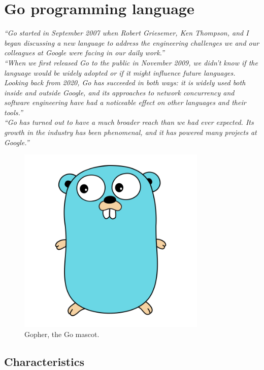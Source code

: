 \documentclass[
  digital,
  color,
  oneside,
  nosansbold,
  nocolorbold,
  nolof,
  nolot,
]{fithesis4}
\begin{document}
\chapter{Go programming language}\label{chapter-go}

\noindent
\textit{\enquote{Go started in September 2007 when Robert Griesemer, Ken Thompson, and I began discussing a new language to address the engineering challenges we and our colleagues at Google were facing in our daily work.}} \\

\noindent
\textit{\enquote{When we first released Go to the public in November 2009, we didn’t know if the language would be widely adopted or if it might influence future languages. Looking back from 2020, Go has succeeded in both ways: it is widely used both inside and outside Google, and its approaches to network concurrency and software engineering have had a noticeable effect on other languages and their tools.}} \\

\noindent
\textit{\enquote{Go has turned out to have a much broader reach than we had ever expected. Its growth in the industry has been phenomenal, and it has powered many projects at Google.}} \cite{go-pike}

\begin{figure}[H]
    \centering
    \includegraphics[width=9cm]{figures/gopher.png}
    \caption{Gopher, the Go mascot.}
\end{figure}

\section{Characteristics}
\end{document}
